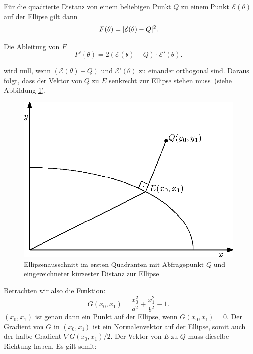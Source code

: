Für die quadrierte Distanz von einem beliebigen Punkt $Q$ zu einem Punkt $\mathcal{E}(\theta)$ auf der Ellipse gilt dann
\begin{equation}
	F(\theta) = \lvert\mathcal{E}(\theta) - Q\rvert^2.
\end{equation}

Die Ableitung von $F$
\begin{equation}
F'(\theta) = 2\left(\mathcal{E}(\theta) - Q\right) \cdot \mathcal{E}'(\theta).
\end{equation}

wird null, wenn $\left(\mathcal{E}(\theta) - Q\right)$ und $ \mathcal{E}'(\theta)$ zu einander orthogonal sind. Daraus folgt, dass der Vektor von $Q$ zu $E$ senkrecht zur Ellipse stehen muss.  (siehe Abbildung \ref{fig:ellipseDist}). 


\begin{figure}[!htb]
	\centering
	\includegraphics[scale=.9]{images/ellipseQuery.eps}
	\caption{Ellipsenausschnitt im ersten Quadranten mit Abfragepunkt $Q$ und eingezeichneter kürzester Distanz zur Ellipse}
	\label{fig:ellipseDist}
\end{figure}

Betrachten wir also die Funktion:
\begin{equation} \label{eq:ellipseDistEq}
	G(x_0,x_1) = \frac{x_0^2}{a^2} + \frac{x_1^2}{b^2} - 1.
\end{equation}
$(x_0,x_1)$ ist genau dann ein Punkt auf der Ellipse, wenn $G(x_0,x_1) = 0$. Der Gradient von $G$ in $(x_0,x_1)$ ist ein Normalenvektor auf der Ellipse, somit auch der halbe Gradient $\nabla G(x_0,x_1)/2$. Der Vektor von $E$ zu $Q$ muss dieselbe Richtung haben. Es gilt somit:

